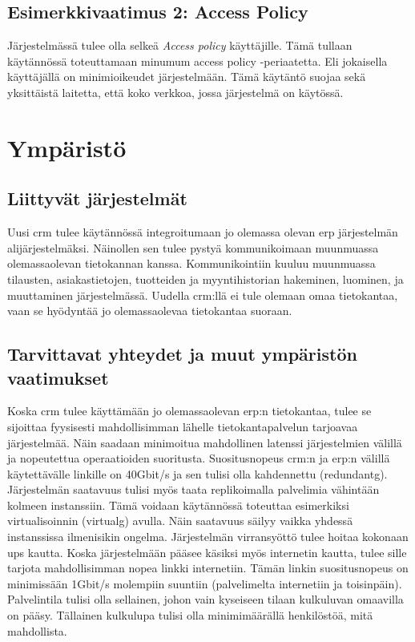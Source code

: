     \subsection{Esimerkkivaatimus 2: Access Policy}
        Järjestelmässä tulee olla selkeä \textit{Access policy} käyttäjille. Tämä tullaan käytännössä toteuttamaan
        minumum access policy -periaatetta. Eli jokaisella käyttäjällä on minimioikeudet järjestelmään.
        Tämä käytäntö suojaa sekä yksittäistä laitetta, että koko verkkoa, jossa järjestelmä on käytössä. 

\section{Ympäristö}     %
    \subsection{Liittyvät järjestelmät}     %
        Uusi \gls{crm} tulee käytännössä integroitumaan jo olemassa olevan \gls{erp} järjestelmän alijärjestelmäksi. Näinollen sen tulee pystyä kommunikoimaan
         muunmuassa olemassaolevan tietokannan kanssa. Kommunikointiin kuuluu muunmuassa tilausten, asiakastietojen, tuotteiden ja myyntihistorian hakeminen, 
         luominen, ja muuttaminen järjestelmässä. Uudella \gls{crm}:llä ei tule olemaan omaa tietokantaa, vaan se hyödyntää jo olemassaolevaa tietokantaa suoraan. 

    \subsection{Tarvittavat yhteydet ja muut ympäristön vaatimukset}  %
        Koska \gls{crm} tulee käyttämään jo olemassaolevan \gls{erp}:n tietokantaa, tulee se sijoittaa fyysisesti mahdollisimman lähelle tietokantapalvelun
        tarjoavaa järjestelmää. Näin saadaan minimoitua mahdollinen latenssi järjestelmien välillä ja nopeutettua operaatioiden suoritusta. Suositusnopeus 
        \gls{crm}:n ja \gls{erp}:n välillä käytettävälle linkille on 40Gbit/s ja sen tulisi olla kahdennettu (\gls{redundantg}). 
        Järjestelmän saatavuus tulisi myös taata replikoimalla palvelimia vähintään kolmeen instanssiin. Tämä voidaan käytännössä toteuttaa esimerkiksi virtualisoinnin 
        (\gls{virtualg}) avulla. Näin saatavuus säilyy vaikka yhdessä instanssissa ilmenisikin ongelma. Järjestelmän virransyöttö tulee hoitaa kokonaan \gls{ups} kautta. 
        Koska järjestelmään pääsee käsiksi myös internetin kautta, tulee sille tarjota mahdollisimman nopea linkki internetiin. Tämän linkin suositusnopeus on minimissään 
        1Gbit/s molempiin suuntiin (palvelimelta internetiin ja toisinpäin). 
        Palvelintila tulisi olla sellainen, johon vain kyseiseen tilaan kulkuluvan omaavilla on pääsy. Tällainen kulkulupa tulisi olla minimimäärällä henkilöstöä, mitä mahdollista. 

